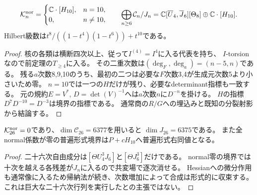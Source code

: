 \begin{theorem}[普遍通常接触商の全次数決定]
\label{thm:pf-full-contact-module}
\[
 \mathcal K_n^{\rm nor}=
 \begin{cases}\mathbb C\cdot[H_{10}],&n=10,\\0,&n\ne10,\end{cases}
 \qquad
 \bigoplus_{n\ge6}\mathcal C_n/J_n
 =\mathbb C[\overline U_4,\overline J_6][\Theta_8]\oplus\mathbb C\cdot[H_{10}].
\]
Hilbert級数は$t^8/((1-t^4)(1-t^6))+t^{10}$である。
\end{theorem}
\begin{proof}
核の各類は横断四次以上、従って$I^{(4)}=I^4$に入る代表を持ち、
$I$-torsionなので前定理の$T_{\ge4}$に入る。
その二重次数は$(\deg_F,\deg_a)=(n-5,n)$である。
残る$a$次数8,9,10のうち、最初の二つは必要な$F$次数3,4が生成元次数5より小さいため零。
$n=10$では一つの$H$だけが残り、必要なdeterminant指標も一致する。
元の規約$E=V^*$, $D=\det(V)^{-1}$へは$a$次数$n$に$D^{-n}$を掛ける。
$H$の指標$D^7D^{-10}=D^{-3}$は境界の指標である。
通常商の$R/G$への埋込みと既知の分裂射影から結論する。
\end{proof}
\begin{corollary}[有限通常rankと十次形式決定性]
$\mathcal K_{26}^{\rm nor}=0$であり、$\dim\mathcal C_{26}=6377$を用いると
$\dim J_{26}=6375$である。
また全normal係数が零の普遍形式境界は$P+cH_{10}$へ普遍形式右同値となる。
\end{corollary}
\begin{proof}
二十六次自由成分は$[\Theta U_4^3J_6]$と$[\Theta J_6^3]$だけである。
normal零の境界では十次を越える各残差が$J_n$に入るので共変場で逐次消せる。
Hessianへの微分作用も通常像に入るため帰納法が続き、次数増加によって合成は形式的に収束する。
これは巨大な二十六次行列を実行したとの主張ではない。
\end{proof}
